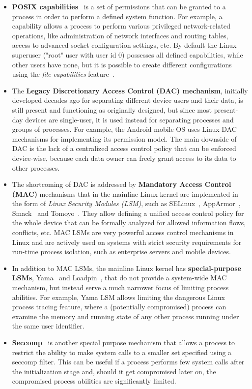\begin{itemize}
	\item \textbf{POSIX capabilities}~\cite{caps} is a set of permissions that can be granted to a process in order to perform a defined system function. For example, a  capability allows a process to perform various privileged network-related operations, like administration of network interfaces and routing tables, access to advanced socket configuration settings, etc. By default the Linux superuser ("root" user with user id 0) possesses all defined capabilities, while other users have none, but it is possible to create different configurations using the \textit{file capabilities} feature~\cite{filecaps}. 
	\item The \textbf{Legacy Discretionary Access Control (DAC) mechanism}, initially developed decades ago for separating different device users and their data, is still present and functioning as originally designed, but since most present-day devices are single-user, it is used instead for separating processes and groups of processes. For example, the Android mobile OS uses Linux DAC mechanisms for implementing its permission model. The main downside of DAC is the lack of a centralized access control policy that can be enforced device-wise, because each data owner can freely grant access to its data to other processes. 
	\item The shortcoming of DAC is addressed by \textbf{Mandatory Access Control (MAC)} mechanisms that in the mainline Linux kernel are implemented in the form of \textit{Linux Security Modules (LSM)}, such as SELinux~\cite{smalley2001implementing}, AppArmor~\cite{bauer2006paranoid}, Smack~\cite{bauer2006paranoid} and Tomoyo~\cite{tomoyo}. They allow defining a unified access control policy for the whole device that can be formally analyzed for allowed information flows, conflicts, etc. MAC LSMs are very powerful access control mechanisms in Linux and are actively used on systems with strict security requirements for run-time process isolation, such as enterprise servers and mobile devices. 
	\item In addition to MAC LSMs, the mainline Linux kernel has \textbf{special-purpose LSMs}, Yama~\cite{yama} and Loadpin~\cite{loadpin}, that do not provide a system-wide MAC mechanism, but instead serve a much narrower focus of limiting process abilities. For example, Yama LSM allows limiting the dangerous Linux process tracing feature, where a (potentially compromised) process can examine the memory and running state of any other process running under the same user identifier. 
	\item \textbf{Seccomp}~\cite{seccomp2016} is another special purpose mechanism that allows a process to restrict the ability to make system calls to a smaller set specified using a seccomp filter. This can be useful if a process performs few system calls after the initialization stage and, should it get compromised later on, the compromised process abilities are significantly limited.
\end{itemize} 

